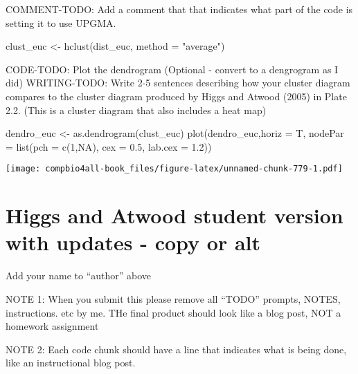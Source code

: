 \documentclass[
]{book}
\newenvironment{Shaded}{\begin{snugshade}}{\end{snugshade}}
\newcommand{\AttributeTok}[1]{\textcolor[rgb]{0.77,0.63,0.00}{#1}}
\newcommand{\ConstantTok}[1]{\textcolor[rgb]{0.00,0.00,0.00}{#1}}
\newcommand{\DecValTok}[1]{\textcolor[rgb]{0.00,0.00,0.81}{#1}}
\newcommand{\FloatTok}[1]{\textcolor[rgb]{0.00,0.00,0.81}{#1}}
\newcommand{\FunctionTok}[1]{\textcolor[rgb]{0.00,0.00,0.00}{#1}}
\newcommand{\NormalTok}[1]{#1}
\newcommand{\OtherTok}[1]{\textcolor[rgb]{0.56,0.35,0.01}{#1}}
\newcommand{\StringTok}[1]{\textcolor[rgb]{0.31,0.60,0.02}{#1}}
\begin{document}
COMMENT-TODO: Add a comment that that indicates what part of the code is setting it to use UPGMA.

\begin{Shaded}
\begin{Highlighting}[]
\NormalTok{clust\_euc }\OtherTok{\textless{}{-}} \FunctionTok{hclust}\NormalTok{(dist\_euc,}
                    \AttributeTok{method =} \StringTok{"average"}\NormalTok{)}
\end{Highlighting}
\end{Shaded}

CODE-TODO: Plot the dendrogram
(Optional - convert to a dengrogram as I did)
WRITING-TODO: Write 2-5 sentences describing how your cluster diagram compares to the cluster diagram produced by Higgs and Atwood (2005) in Plate 2.2. (This is a cluster diagram that also includes a heat map)

\begin{Shaded}
\begin{Highlighting}[]
\NormalTok{dendro\_euc }\OtherTok{\textless{}{-}} \FunctionTok{as.dendrogram}\NormalTok{(clust\_euc)}
\FunctionTok{plot}\NormalTok{(dendro\_euc,}\AttributeTok{horiz =}\NormalTok{ T,}
     \AttributeTok{nodePar =} \FunctionTok{list}\NormalTok{(}\AttributeTok{pch =} \FunctionTok{c}\NormalTok{(}\DecValTok{1}\NormalTok{,}\ConstantTok{NA}\NormalTok{), }
                  \AttributeTok{cex =} \FloatTok{0.5}\NormalTok{, }
                   \AttributeTok{lab.cex =} \FloatTok{1.2}\NormalTok{))}
\end{Highlighting}
\end{Shaded}

\texttt{[image: compbio4all-book\_files/figure-latex/unnamed-chunk-779-1.pdf]}

\hypertarget{higgs-and-atwood-student-version-with-updates---copy-or-alt}{%
\chapter{Higgs and Atwood student version with updates - copy or alt}\label{higgs-and-atwood-student-version-with-updates---copy-or-alt}}

Add your name to ``author'' above

NOTE 1: When you submit this please remove all ``TODO'' prompts, NOTES, instructions. etc by me. THe final product should look like a blog post, NOT a homework assignment

NOTE 2: Each code chunk should have a line that indicates what is being done, like an instructional blog post.
\end{document}
